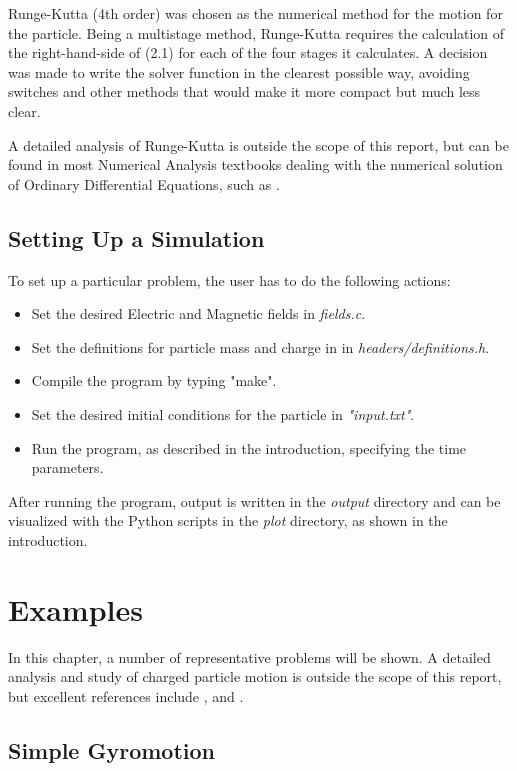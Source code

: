 \documentclass[11pt]{report}
\begin{document}
Runge-Kutta (4th order) was chosen as the numerical method for the motion for the particle. Being a multistage method, Runge-Kutta requires the calculation of the right-hand-side of (2.1) for each of the four stages it calculates. A decision was made to write the solver function in the clearest possible way, avoiding switches and other methods that would make it more compact but much less clear.
\newline

A detailed analysis of Runge-Kutta is outside the scope of this report, but can be found in most Numerical Analysis textbooks dealing with the numerical solution of Ordinary Differential Equations, such as \cite{leveque}.

\newpage
\section{Setting Up a Simulation}
To set up a particular problem, the user has to do the following actions:

\begin{itemize}
\item Set the desired Electric and Magnetic fields in \emph{fields.c}.
\item Set the definitions for particle mass and charge in in \emph{headers/definitions.h}.
\item Compile the program by typing "make".
\item Set the desired initial conditions for the particle in \emph{"input.txt"}.
\item Run the program, as described in the introduction, specifying the time parameters.
\end{itemize}

After running the program, output is written in the \emph{output} directory and can be visualized with the Python scripts in the \emph{plot} directory, as shown in the introduction.

\chapter{Examples}
In this chapter, a number of representative problems will be shown. A detailed analysis and study of charged particle motion is outside the scope of this report, but excellent references include \cite{goldston}, \cite{freidberg} and \cite{bellan}.

\section{Simple Gyromotion}
\end{document}
